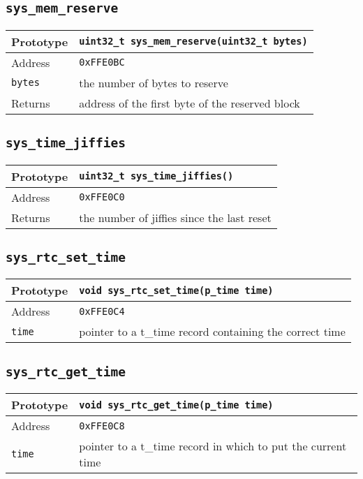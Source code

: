 \subsection*{\texttt{sys\_mem\_reserve}}
\begin{tabular}{|l||l|} \hline
Prototype & \lstinline!uint32_t sys_mem_reserve(uint32_t bytes)! \\ \hline
Address & \texttt{0xFFE0BC} \\ \hline
\lstinline!bytes! & the number of bytes to reserve \\ \hline
Returns & address of the first byte of the reserved block \\ \hline
\end{tabular}

\subsection*{\texttt{sys\_time\_jiffies}}
\begin{tabular}{|l||l|} \hline
Prototype & \lstinline!uint32_t sys_time_jiffies()! \\ \hline
Address & \texttt{0xFFE0C0} \\ \hline
Returns & the number of jiffies since the last reset \\ \hline
\end{tabular}

\subsection*{\texttt{sys\_rtc\_set\_time}}
\begin{tabular}{|l||l|} \hline
Prototype & \lstinline!void sys_rtc_set_time(p_time time)! \\ \hline
Address & \texttt{0xFFE0C4} \\ \hline
\lstinline!time! & pointer to a t\_time record containing the correct time \\ \hline
\end{tabular}

\subsection*{\texttt{sys\_rtc\_get\_time}}
\begin{tabular}{|l||l|} \hline
Prototype & \lstinline!void sys_rtc_get_time(p_time time)! \\ \hline
Address & \texttt{0xFFE0C8} \\ \hline
\lstinline!time! & pointer to a t\_time record in which to put the current time \\ \hline
\end{tabular}

